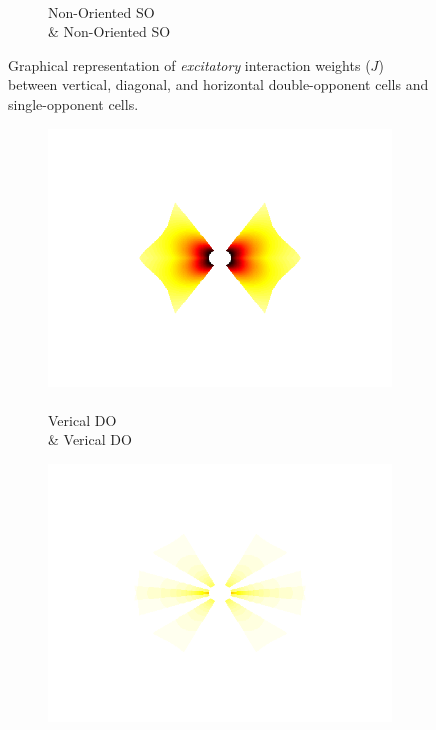 \documentclass[journal,onecolumn]{IEEEtran}
\begin{document}
\begin{figure}[h]
\begin{subfigure}[b]{0.2\textwidth}
            \caption{\\ Non-Oriented SO \\ \& Non-Oriented SO}
    \end{subfigure}%
    \caption{Graphical representation of \textit{excitatory} interaction weights ($J$) between vertical, diagonal, and horizontal double-opponent cells and single-opponent cells.}
\end{figure}

\begin{figure}[h] \label{fig:bowtie-excite-maps}
    \centering
    \begin{subfigure}[b]{0.2\textwidth}
            \centering
            \captionsetup{justification=centering}
            \includegraphics[width=.85\linewidth]{map-w_1_1}
            \caption{\\ Verical DO \\ \& Verical DO}
    \end{subfigure}%
    \begin{subfigure}[b]{0.2\textwidth}
            \centering
            \captionsetup{justification=centering}
            \includegraphics[width=.85\linewidth]{map-w_1_2}

\end{subfigure}
\end{figure}
\end{document}
